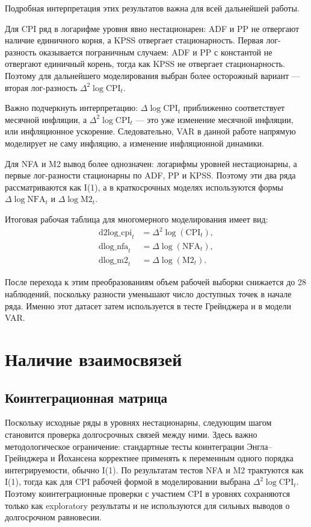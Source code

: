 \documentclass[12pt,a4paper]{article}
\begin{document}
Подробная интерпретация этих результатов важна для всей дальнейшей работы.

Для CPI ряд в логарифме уровня явно нестационарен: ADF и PP не отвергают наличие единичного
корня, а KPSS отвергает стационарность. Первая лог-разность оказывается пограничным случаем:
ADF и PP с константой не отвергают единичный корень, тогда как KPSS не отвергает
стационарность. Поэтому для дальнейшего моделирования выбран более осторожный вариант ---
вторая лог-разность $\Delta^2 \log \mathrm{CPI}_t$.

Важно подчеркнуть интерпретацию: $\Delta \log \mathrm{CPI}_t$ приближенно соответствует
месячной инфляции, а $\Delta^2 \log \mathrm{CPI}_t$ --- это уже изменение месячной инфляции,
или инфляционное ускорение. Следовательно, VAR в данной работе напрямую моделирует не саму
инфляцию, а изменение инфляционной динамики.

Для NFA и M2 вывод более однозначен: логарифмы уровней нестационарны, а первые лог-разности
стационарны по ADF, PP и KPSS. Поэтому эти два ряда рассматриваются как I(1), а в
краткосрочных моделях используются формы $\Delta \log \mathrm{NFA}_t$ и
$\Delta \log \mathrm{M2}_t$.

Итоговая рабочая таблица для многомерного моделирования имеет вид:
\[
\begin{aligned}
\text{d2log\_cpi}_t &= \Delta^2 \log(\mathrm{CPI}_t),\\
\text{dlog\_nfa}_t &= \Delta \log(\mathrm{NFA}_t),\\
\text{dlog\_m2}_t &= \Delta \log(\mathrm{M2}_t).
\end{aligned}
\]

После перехода к этим преобразованиям объем рабочей выборки снижается до 28 наблюдений,
поскольку разности уменьшают число доступных точек в начале ряда. Именно этот датасет затем
используется в тесте Грейнджера и в модели VAR.

\section{Наличие взаимосвязей}
\subsection{Коинтеграционная матрица}
Поскольку исходные ряды в уровнях нестационарны, следующим шагом становится проверка
долгосрочных связей между ними. Здесь важно методологическое ограничение: стандартные тесты
коинтеграции Энгла--Грейнджера и Йохансена корректнее применять к переменным одного порядка
интегрируемости, обычно I(1). По результатам тестов NFA и M2 трактуются как I(1), тогда как
для CPI рабочей формой в моделировании выбрана $\Delta^2 \log \mathrm{CPI}_t$. Поэтому
коинтеграционные проверки с участием CPI в уровнях сохраняются только как exploratory
результаты и не используются для сильных выводов о долгосрочном равновесии.
\end{document}
